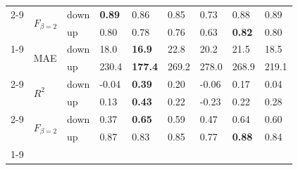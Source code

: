 \begin{table}
\begin{tabular}{lllllllll}
\cline{2-9}
 & \multirow[t]{2}{*}{$F_{\beta=2}$} & down & \textbf{0.89} & 0.86 & 0.85 & 0.73 & 0.88 & 0.89 \\
 &  & up & 0.80 & 0.78 & 0.76 & 0.63 & \textbf{0.82} & 0.80 \\
\cline{1-9} \cline{2-9}
\multirow[t]{6}{*}{TransnetBW} & \multirow[t]{2}{*}{MAE} & down & 18.0 & \textbf{16.9} & 22.8 & 20.2 & 21.5 & 18.5 \\
 &  & up & 230.4 & \textbf{177.4} & 269.2 & 278.0 & 268.9 & 219.1 \\
\cline{2-9}
 & \multirow[t]{2}{*}{$R^2$} & down & -0.04 & \textbf{0.39} & 0.20 & -0.06 & 0.17 & 0.04 \\
 &  & up & 0.13 & \textbf{0.43} & 0.22 & -0.23 & 0.22 & 0.28 \\
\cline{2-9}
 & \multirow[t]{2}{*}{$F_{\beta=2}$} & down & 0.37 & \textbf{0.65} & 0.59 & 0.47 & 0.64 & 0.60 \\
 &  & up & 0.87 & 0.83 & 0.85 & 0.77 & \textbf{0.88} & 0.84 \\
\cline{1-9} \cline{2-9}
\bottomrule
\end{tabular}
\end{table}
